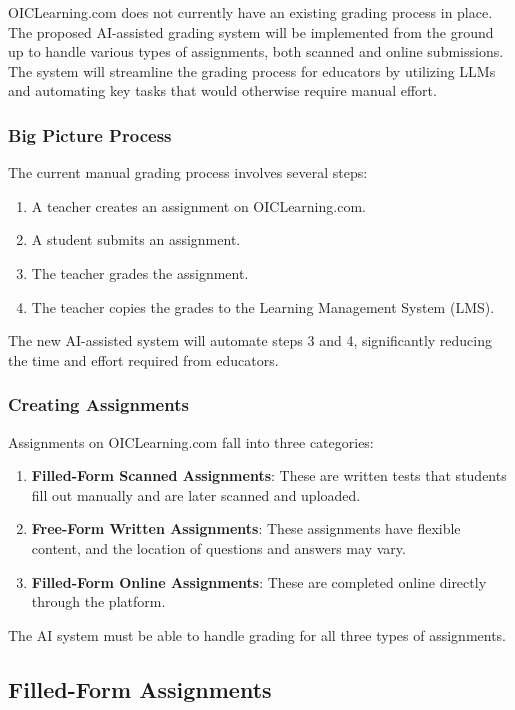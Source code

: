 \documentclass[ms,twoside,print]{nuthesis}
\begin{document}
OICLearning.com does not currently have an existing grading process in place. The proposed AI-assisted grading system will be implemented from the ground up to handle various types of assignments, both scanned and online submissions. The system will streamline the grading process for educators by utilizing LLMs and automating key tasks that would otherwise require manual effort.

\subsubsection{Big Picture Process}

The current manual grading process involves several steps:
\begin{enumerate}
    \item A teacher creates an assignment on OICLearning.com.
    \item A student submits an assignment.
    \item The teacher grades the assignment.
    \item The teacher copies the grades to the Learning Management System (LMS).
\end{enumerate}

The new AI-assisted system will automate steps 3 and 4, significantly reducing the time and effort required from educators.

\subsubsection{Creating Assignments}

Assignments on OICLearning.com fall into three categories:
\begin{enumerate}
    \item \textbf{Filled-Form Scanned Assignments}: These are written tests that students fill out manually and are later scanned and uploaded.
    \item \textbf{Free-Form Written Assignments}: These assignments have flexible content, and the location of questions and answers may vary.
    \item \textbf{Filled-Form Online Assignments}: These are completed online directly through the platform.
\end{enumerate}

The AI system must be able to handle grading for all three types of assignments.

\subsection{Filled-Form Assignments}
\end{document}
